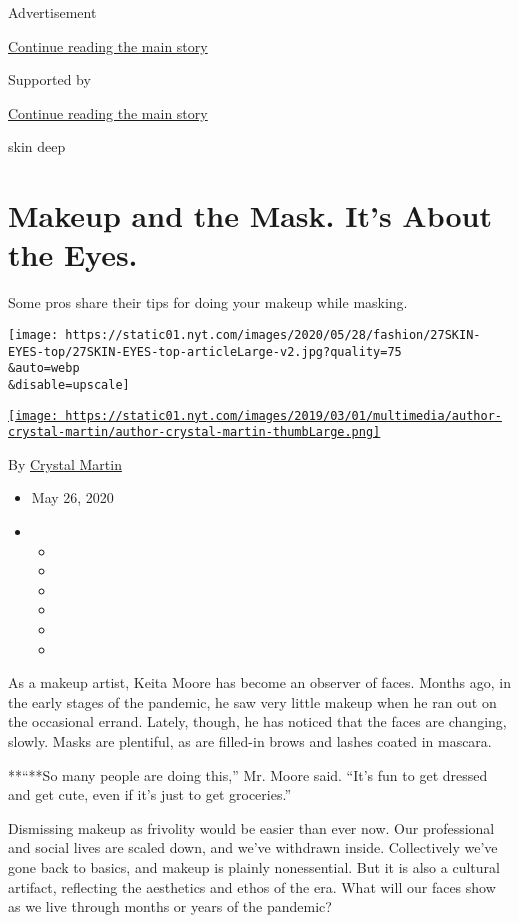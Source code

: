 Advertisement

\protect\hyperlink{after-top}{Continue reading the main story}

Supported by

\protect\hyperlink{after-sponsor}{Continue reading the main story}

skin deep

\hypertarget{makeup-and-the-mask-its-about-the-eyes}{%
\section{Makeup and the Mask. It's About the
Eyes.}\label{makeup-and-the-mask-its-about-the-eyes}}

Some pros share their tips for doing your makeup while masking.

\texttt{[image: https://static01.nyt.com/images/2020/05/28/fashion/27SKIN-EYES-top/27SKIN-EYES-top-articleLarge-v2.jpg?quality=75\\\&auto=webp\\\&disable=upscale]}

\href{https://www.nytimes.com/by/crystal-martin}{\texttt{[image: https://static01.nyt.com/images/2019/03/01/multimedia/author-crystal-martin/author-crystal-martin-thumbLarge.png]}}

By \href{https://www.nytimes.com/by/crystal-martin}{Crystal Martin}

\begin{itemize}
\item
  May 26, 2020
\item
  \begin{itemize}
  \item
  \item
  \item
  \item
  \item
  \item
  \end{itemize}
\end{itemize}

As a makeup artist, Keita Moore has become an observer of faces. Months
ago, in the early stages of the pandemic, he saw very little makeup when
he ran out on the occasional errand. Lately, though, he has noticed that
the faces are changing, slowly. Masks are plentiful, as are filled-in
brows and lashes coated in mascara.

**``**So many people are doing this,'' Mr. Moore said. ``It's fun to get
dressed and get cute, even if it's just to get groceries.''

Dismissing makeup as frivolity would be easier than ever now. Our
professional and social lives are scaled down, and we've withdrawn
inside. Collectively we've gone back to basics, and makeup is plainly
nonessential. But it is also a cultural artifact, reflecting the
aesthetics and ethos of the era. What will our faces show as we live
through months or years of the pandemic?

